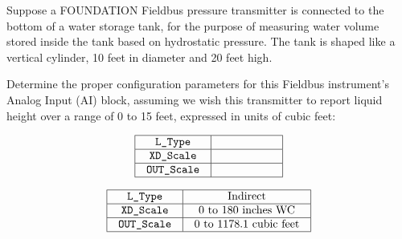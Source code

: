 

Suppose a FOUNDATION Fieldbus pressure transmitter is connected to the bottom of a water storage tank, for the purpose of measuring water volume stored inside the tank based on hydrostatic pressure.  The tank is shaped like a vertical cylinder, 10 feet in diameter and 20 feet high.

\vskip 10pt

Determine the proper configuration parameters for this Fieldbus instrument's Analog Input (AI) block, assuming we wish this transmitter to report liquid height over a range of 0 to 15 feet, expressed in units of cubic feet:


$$\vbox{\offinterlineskip
\halign{\strut
\vrule \quad\hfil # \ \hfil & 
\vrule \quad\hfil # \ \hfil \vrule \cr
\noalign{\hrule}
%
{\tt L\_Type} & \hskip 50pt \cr
%
\noalign{\hrule}
%
{\tt XD\_Scale} & \hskip 50pt \cr
%
\noalign{\hrule}
%
{\tt OUT\_Scale} & \hskip 50pt \cr
%
\noalign{\hrule}
} %
}$$ %








$$\vbox{\offinterlineskip
\halign{\strut
\vrule \quad\hfil # \ \hfil & 
\vrule \quad\hfil # \ \hfil \vrule \cr
\noalign{\hrule}
%
{\tt L\_Type} & Indirect \cr
%
\noalign{\hrule}
%
{\tt XD\_Scale} & 0 to 180 inches WC \cr
%
\noalign{\hrule}
%
{\tt OUT\_Scale} & 0 to 1178.1 cubic feet \cr
%
\noalign{\hrule}
} %
}$$ %












